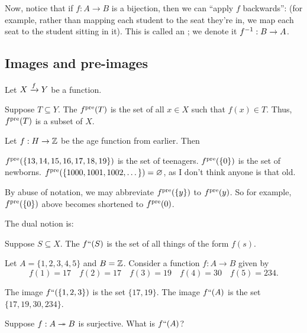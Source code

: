 Now, notice that if $f : A \to B$ is a bijection,
then we can ``apply $f$ backwards'':
(for example, rather than mapping each student to the seat they're in,
we map each seat to the student sitting in it).
This is called an ; we denote it $f^{-1} : B \to A$.

\subsection{Images and pre-images}
Let $X \xrightarrow{f} Y$ be a function.

\begin{definition}
	Suppose $T \subseteq Y$.
	The  $f^{\text{pre}}(T)$ is the set of all
	$x \in X$ such that $f(x) \in T$.
	Thus, $f^{\text{pre}}(T)$ is a subset of $X$.
\end{definition}
\begin{example}
	Let $f : H \to \mathbb Z$ be the age function from earlier.
	Then
	\begin{enumerate}[(a)]
		\ii $f^{\text{pre}}(\{13, 14, 15, 16, 17, 18, 19\})$ is the set of teenagers.
		\ii $f^{\text{pre}}(\{0\})$ is the set of newborns.
		\ii $f^{\text{pre}}(\{1000, 1001, 1002, \dots \}) = \varnothing$,
		as I don't think anyone is that old.
	\end{enumerate}
\end{example}

\begin{abuse}
	By abuse of notation, we may abbreviate $f^{\text{pre}}(\{y\})$ to $f^{\text{pre}}(y)$.
	So for example, $f^{\text{pre}}(\{0\})$ above becomes shortened to $f^{\text{pre}}(0)$.
\end{abuse}

The dual notion is:
\begin{definition}
	Suppose $S \subseteq X$.
	The  $f``(S)$ is the set of all things of the form $f(s)$.
\end{definition}
\begin{example}
	Let $A = \{1,2,3,4,5\}$ and $B = \mathbb Z$.
	Consider a function $f : A \to B$ given by
	\[
		f(1) = 17 \quad
		f(2) = 17 \quad
		f(3) = 19 \quad
		f(4) = 30 \quad
		f(5) = 234.
	\]
	\begin{enumerate}[(a)]
		\ii The image $f``(\{1,2,3\})$ is the set $\{17, 19\}$.
		\ii The image $f``(A)$ is the set $\{17, 19, 30, 234\}$.
	\end{enumerate}
\end{example}
\begin{ques}
	Suppose $f : A \twoheadrightarrow B$ is surjective.
	What is $f``(A)$?
\end{ques}

